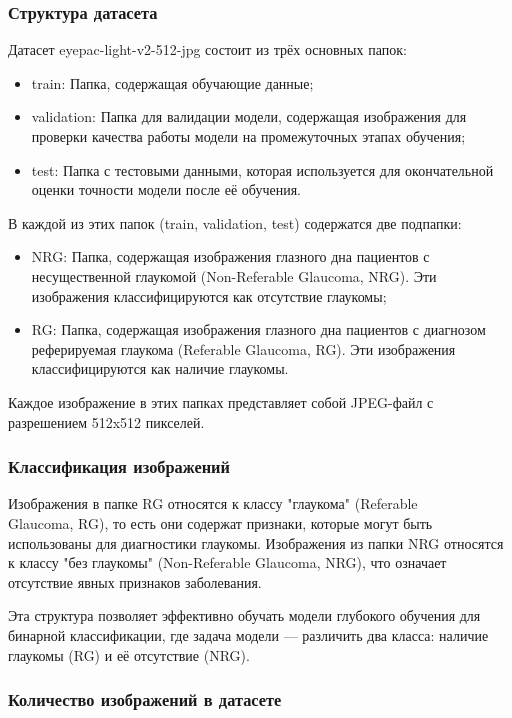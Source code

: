 {    \subsubsection*{Структура датасета}

    Датасет eyepac-light-v2-512-jpg состоит из трёх основных папок:
    \begin{itemize}
        \item train: Папка, содержащая обучающие данные;
        \item validation: Папка для валидации модели, содержащая изображения для проверки качества работы модели на промежуточных этапах обучения;
        \item test: Папка с тестовыми данными, которая используется для окончательной оценки точности модели после её обучения.
    \end{itemize}

    В каждой из этих папок (train, validation, test) содержатся две подпапки:
    \begin{itemize}
        \item NRG: Папка, содержащая изображения глазного дна пациентов с несущественной глаукомой (Non-Referable Glaucoma, NRG). Эти изображения классифицируются как отсутствие глаукомы;
        \item RG: Папка, содержащая изображения глазного дна пациентов с диагнозом реферируемая глаукома (Referable Glaucoma, RG). Эти изображения классифицируются как наличие глаукомы.
    \end{itemize}

    Каждое изображение в этих папках представляет собой JPEG-файл с разрешением 512x512 пикселей. 
    \subsubsection*{Классификация изображений}

    Изображения в папке RG относятся к классу "глаукома" (Referable \\ Glaucoma, RG), то есть они содержат признаки, которые могут быть использованы для диагностики глаукомы. Изображения из папки NRG относятся к классу "без глаукомы" (Non-Referable Glaucoma, NRG), что означает отсутствие явных признаков заболевания.

    Эта структура позволяет эффективно обучать модели глубокого обучения для бинарной классификации, где задача модели — различить два класса: наличие глаукомы (RG) и её отсутствие (NRG).

    \subsubsection*{Количество изображений в датасете}

}
